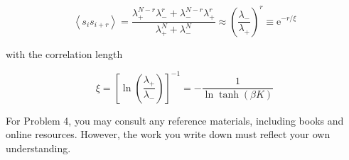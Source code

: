 \documentclass[12pt]{article}
\begin{document}
\begin{equation*}
\left\langle s_{i} s_{i+r}\right\rangle=\frac{\lambda_{+}^{N-r} \lambda_{-}^{r}+\lambda_{-}^{N-r} \lambda_{+}^{r}}{\lambda_{+}^{N}+\lambda_{-}^{N}} \approx\left(\frac{\lambda_{-}}{\lambda_{+}}\right)^{r} \equiv \mathrm{e}^{-r / \xi} \tag{7}
\end{equation*}


with the correlation length


\begin{equation*}
\xi=\left[\ln \left(\frac{\lambda_{+}}{\lambda_{-}}\right)\right]^{-1}=-\frac{1}{\ln \tanh (\beta K)} \tag{8}
\end{equation*}


For Problem 4, you may consult any reference materials, including books and online resources. However, the work you write down must reflect your own understanding.
\end{document}
